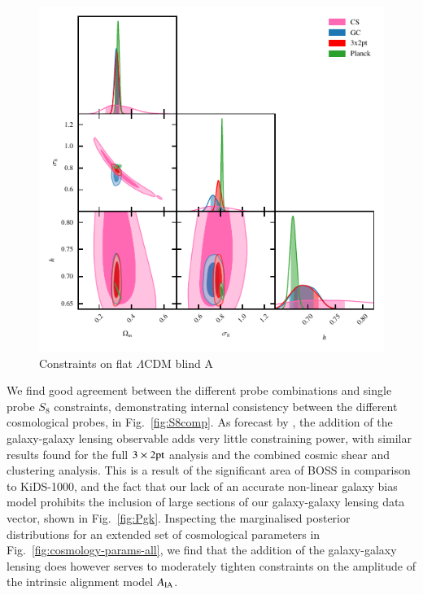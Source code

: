 \begin{figure}
	\begin{center}
		\includegraphics[width=\columnwidth]{Parameter_Plots/cosmology/omegam_sigma8_h_blind_A}
		\caption{Constraints on flat $\Lambda$CDM blind A}
		\label{fig:cosmology-params}
	\end{center}
\end{figure}

We find good agreement between the different probe combinations and single probe $S_8$ constraints, demonstrating internal consistency between the different cosmological probes, in Fig.~\ref{fig:S8comp}.  As forecast by \citet{joachimi/etal:inprep}, the addition of the galaxy-galaxy lensing observable adds very little constraining power, with similar results found for the full $3\times2{\rm pt}$ analysis and the combined cosmic shear and clustering analysis.   This is a result of the significant area of BOSS in comparison to KiDS-1000, and the fact that our lack of an accurate non-linear galaxy bias model prohibits the inclusion of large sections of our galaxy-galaxy lensing data vector, shown in Fig.~\ref{fig:Pgk}.   Inspecting the marginalised posterior distributions for an extended set of cosmological parameters in Fig.~\ref{fig:cosmology-params-all}, we find that the addition of the galaxy-galaxy lensing does however serves to moderately tighten constraints on the amplitude of the intrinsic alignment model $A_{\rm IA}$.   

